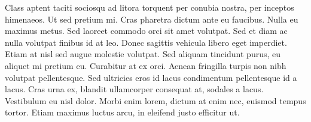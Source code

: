 \documentclass{memoir}
\begin{document}

Class aptent taciti sociosqu ad litora torquent per conubia nostra, per inceptos himenaeos. Ut sed pretium mi. Cras pharetra dictum ante eu faucibus. Nulla eu maximus metus. Sed laoreet commodo orci sit amet volutpat. Sed et diam ac nulla volutpat finibus id at leo. Donec sagittis vehicula libero eget imperdiet. Etiam at nisl sed augue molestie volutpat. Sed aliquam tincidunt purus, eu aliquet mi pretium eu. Curabitur at ex orci. Aenean fringilla turpis non nibh volutpat pellentesque. Sed ultricies eros id lacus condimentum pellentesque id a lacus. Cras urna ex, blandit ullamcorper consequat at, sodales a lacus. Vestibulum eu nisl dolor. Morbi enim lorem, dictum at enim nec, euismod tempus tortor. Etiam maximus luctus arcu, in eleifend justo efficitur ut. 
\end{document}
